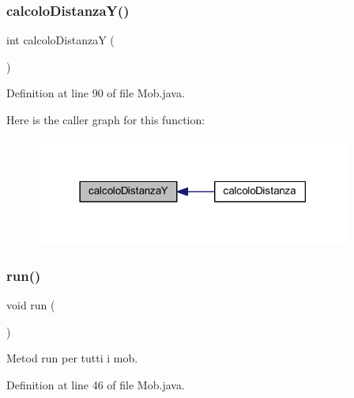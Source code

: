 \subsubsection{\texorpdfstring{calcolo\+Distanza\+Y()}{calcoloDistanzaY()}}
{\footnotesize\ttfamily int calcolo\+DistanzaY (\begin{DoxyParamCaption}{ }\end{DoxyParamCaption})}



Definition at line 90 of file Mob.\+java.

Here is the caller graph for this function\+:
\nopagebreak
\begin{figure}[H]
\begin{center}
\leavevmode
\includegraphics[width=294pt]{class_entita_1_1_mob_a852bb2aeaf4c181e950c7a81b5d06c32_icgraph}
\end{center}
\end{figure}
\mbox{\label{class_entita_1_1_mob_a13a43e6d814de94978c515cb084873b1}} 
\subsubsection{\texorpdfstring{run()}{run()}}
{\footnotesize\ttfamily void run (\begin{DoxyParamCaption}{ }\end{DoxyParamCaption})}



Metod run per tutti i mob. 



Definition at line 46 of file Mob.\+java.

